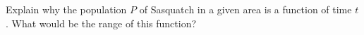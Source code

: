{ Explain why the population $P$ of Sasquatch in a given area is a function of time $t$.  What would be the range of this function?}
{}